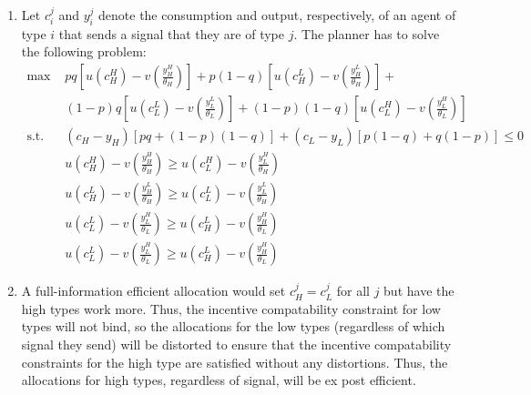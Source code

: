 \documentclass{article}
\newcommand{\usmax}[1]{\underset{#1}{\text{max }}}
\begin{document}
\begin{enumerate}
	\item Let $c_i^j$ and $y_i^j$ denote the consumption and output, respectively, of an agent of type $i$ that sends a signal that they are of type $j$. The planner has to solve the following problem:
		\begin{align*}
			\usmax{}	&pq\left[u(c^H_H) - v\left(\frac{y^H_H}{\theta_H}\right)\right] 
							+ p(1-q)\left[u(c_H^L) - v\left(\frac{y_H^L}{\theta_H}\right)\right] + 												\\
						&(1-p)q\left[u(c^L_L) - v\left(\frac{y^L_L}{\theta_L}\right)\right] 
							+ (1-p)(1-q)\left[u(c^H_L) - v\left(\frac{y^H_L}{\theta_L}\right)\right]											\\
						\text{s.t. }	& (c_H-y_H)[pq + (1-p)(1-q)] + (c_L-y_L)[p(1-q) + q(1-p)] \leq 0										\\
										& u(c^H_H) - v\left(\frac{y^H_H}{\theta_H}\right) \geq u(c^H_L) - v\left(\frac{y^H_L}{\theta_H}\right)	\\
										& u(c^L_H) - v\left(\frac{y^L_H}{\theta_H}\right) \geq u(c^L_L) - v\left(\frac{y^L_L}{\theta_H}\right)	\\
										& u(c^L_L) - v\left(\frac{y^H_L}{\theta_L}\right) \geq u(c^L_H) - v\left(\frac{y^H_H}{\theta_L}\right)	\\
										& u(c^L_L) - v\left(\frac{y^H_L}{\theta_L}\right) \geq u(c^L_H) - v\left(\frac{y^H_H}{\theta_L}\right)	
		\end{align*}
	
	\item A full-information efficient allocation would set ${c^j_H=c^j_L}$ for all $j$ but have the high types work more. Thus, the incentive compatability constraint for low types will not bind, so the allocations for the low types (regardless of which signal they send) will be distorted to ensure that the incentive compatability constraints for the high type are satisfied without any distortions. Thus, the allocations for high types, regardless of signal, will be ex post efficient. 
	
\end{enumerate}


\end{document}
